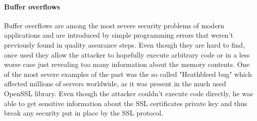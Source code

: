 \paragraph{Buffer overflows}
Buffer overflows are among the most severe security problems of modern applications and are introduced by simple programming errors that weren't previously found in quality assurance steps. Even though they are hard to find, once used they allow the attacker to hopefully execute arbitrary code or in a less worse case just revealing too many information about the memory contents. One of the most severe examples of the past was the so called "Heathbleed bug" which affected millions of servers worldwide, as it was present in the much used OpenSSL library. Even though the attacker couldn't execute code directly, he was able to get sensitive information about the SSL certificates private key and thus break any security put in place by the SSL protocol.